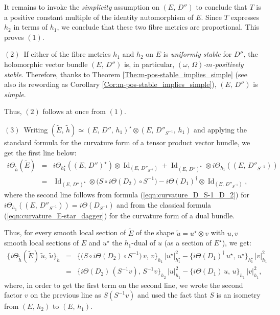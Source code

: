 \documentclass[12pt]{article}
\begin{document}
It remains to invoke the {\it simplicity} assumption on $(E,\,D'')$ to conclude that $T$ is a positive constant multiple of the identity automorphism of $E$. Since $T$ expresses $h_2$ in terms of $h_1$, we conclude that these two fibre metrics are proportional. This proves $(1)$. 

\vspace{1ex}

$(2)$\, If either of the fibre metrics $h_1$ and $h_2$ on $E$ is {\it uniformly stable} for $D''$, the holomorphic vector bundle $(E,\,D'')$ is, in particular, {\it $(\omega,\,\Omega)$-$m$-positively stable}. Therefore, thanks to Theorem \ref{The:m-pos-stable_implies_simple} (see also its rewording as Corollary \ref{Cor:m-pos-stable_implies_simple}), $(E,\,D'')$ is {\it simple}.

Thus, $(2)$ follows at once from $(1)$.

\vspace{1ex}

$(3)$\, Writing $(\widetilde{E},\,\widetilde{h})\simeq (E,\,D'',\,h_1)^\star\otimes(E,\,D''_{S^{-1}},\,h_1)$ and applying the standard formula for the curvature form of a tensor product vector bundle, we get the first line below: \begin{eqnarray*}i\Theta_{\widetilde{h}}(\widetilde{E}) & = & i\Theta_{h_1^\star}((E,\,D'')^\star)\otimes\operatorname{Id}_{(E,\,D''_{S^{-1}})} + \operatorname{Id}_{(E,\,D'')^\star}\otimes i\Theta_{h_1}((E,\,D''_{S^{-1}})) \\
  & = & \operatorname{Id}_{(E,\,D'')^\star}\otimes\bigg(S\circ i\Theta(D_2)\circ S^{-1}\bigg) - i\Theta(D_1)^{\dagger}\otimes\operatorname{Id}_{(E,\,D''_{S^{-1}})},\end{eqnarray*} where the second line follows from formula (\ref{eqn:curvature_D_S-1_D_2}) for $i\Theta_{h_1}((E,\,D''_{S^{-1}})) = i\Theta(D_{S^{-1}})$ and from the classical formula (\ref{eqn:curvature_E-star_dagger}) for the curvature form of a dual bundle.

Thus, for every smooth local section of $\widetilde{E}$ of the shape $\widetilde{u} = u^\star\otimes v$ with $u,v$ smooth local sections of $E$ and $u^\star$ the $h_1$-dual of $u$ (as a section of $E^\star$), we get: \begin{eqnarray*}\bigg\{i\Theta_{\widetilde{h}}(\widetilde{E})\,\widetilde{u},\,\widetilde{u}\bigg\}_{\widetilde{h}} & = & \bigg\{\bigg(S\circ i\Theta(D_2)\circ S^{-1}\bigg)\,v,\,v\bigg\}_{h_1}\,|u^\star|^2_{h_1^\star} - \bigg\{i\Theta(D_1)^{\dagger}\,u^\star,\,u^\star\bigg\}_{h_1^\star}\,|v|^2_{h_1} \\
  & = & \bigg\{i\Theta(D_2)\,(S^{-1}v),\,S^{-1}v\bigg\}_{h_2}\,|u|^2_{h_1} - \bigg\{i\Theta(D_1)\,u,\,u\bigg\}_{h_1}\,|v|^2_{h_1},\end{eqnarray*} where, in order to get the first term on the second line, we wrote the second factor $v$ on the previous line as $S(S^{-1}v)$ and used the fact that $S$ is an isometry from $(E,\,h_2)$ to $(E,\,h_1)$.
\end{document}
